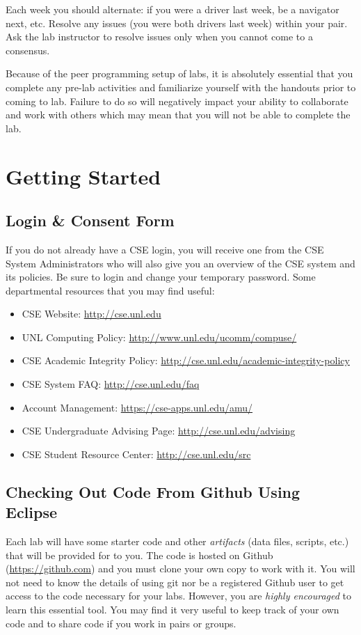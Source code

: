 \documentclass[12pt]{scrartcl}
\begin{document}
Each week you should alternate: if you were a driver last week, 
be a navigator next, etc.  Resolve any issues (you were both drivers
last week) within your pair.  Ask the lab instructor to resolve issues
only when you cannot come to a consensus.  

Because of the peer programming setup of labs, it is absolutely 
essential that you complete any pre-lab activities and familiarize
yourself with the handouts prior to coming to lab.  Failure to do
so will negatively impact your ability to collaborate and work with 
others which may mean that you will not be able to complete the
lab.  

\section{Getting Started}

\subsection{Login \& Consent Form}

If you do not already have a CSE login, you will receive one from 
the CSE System Administrators who will also give you an overview 
of the CSE system and its policies.  Be sure to login and 
change your temporary password.  Some departmental resources 
that you may find useful:
\begin{itemize}
  \item CSE Website: \url{http://cse.unl.edu}
  \item UNL Computing Policy: \url{http://www.unl.edu/ucomm/compuse/}
   \item CSE Academic Integrity Policy: \url{http://cse.unl.edu/academic-integrity-policy}
   \item CSE System FAQ: \url{http://cse.unl.edu/faq}
   \item Account Management: \url{https://cse-apps.unl.edu/amu/}
   \item CSE Undergraduate Advising Page: \url{http://cse.unl.edu/advising}
   \item CSE Student Resource Center: \url{http://cse.unl.edu/src}
\end{itemize}

\subsection{Checking Out Code From Github Using Eclipse}

Each lab will have some starter code and other \emph{artifacts} (data files, 
scripts, etc.) that will be provided for to you.  The code is hosted
on Github (\url{https://github.com}) and you must clone your own copy
to work with it.  You will not need to know the details of using git 
nor be a registered Github user to get access to the code necessary 
for your labs.  However, you are \emph{highly encouraged} to learn 
this essential tool.  You may find it very useful to keep track of your 
own code and to share code if you work in pairs or groups.  
\end{document}
